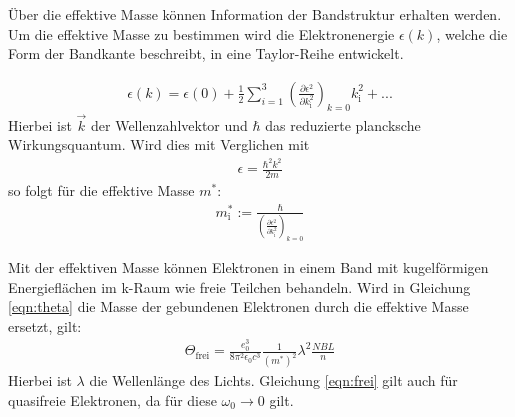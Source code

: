 Über die effektive Masse können Information der Bandstruktur erhalten werden.
Um die effektive Masse zu bestimmen wird die Elektronenergie $\epsilon (k)$,
welche die Form der Bandkante beschreibt, in eine Taylor-Reihe entwickelt.

\begin{align}
  \epsilon(k) = \epsilon (0) + \frac{1}{2} \sum_{i=1}^3 \left(\frac{\partial \epsilon^2}{\partial k^2_{\mathrm{i}}}\right)_{k=0} k_{\mathrm{i}}^2 + ...
\end{align}
Hierbei ist $\vec{k}$ der Wellenzahlvektor und $\hbar$ das reduzierte plancksche Wirkungsquantum.
Wird dies mit Verglichen mit
\begin{align}
  \epsilon = \frac{\hbar^2 k^2}{2m}
\end{align}
so folgt für die effektive Masse $m^*$:
\begin{align}
  m^*_{\mathrm{i}} := \frac{\hbar}{\left(\frac{\partial \epsilon^2}{\partial k^2_{\mathrm{i}}}\right)_{k=0}}
\end{align}

Mit der effektiven Masse können Elektronen in einem Band mit kugelförmigen
Energieflächen im k-Raum wie freie Teilchen behandeln.
Wird in Gleichung \ref{eqn:theta} die Masse der gebundenen Elektronen durch die effektive Masse ersetzt, gilt:
\begin{align}
  \Theta_{\mathrm{frei}} = \frac{e^3_0}{8 \pi^2 \epsilon_0 c^3}\frac{1}{\left(m^{*}\right)^2} \lambda^2 \frac{NBL}{n} \label{eqn:frei}
\end{align}
Hierbei ist $\lambda$ die Wellenlänge des Lichts.
Gleichung \ref{eqn:frei} gilt auch für quasifreie Elektronen, da für diese $\omega_0 \rightarrow 0$ gilt.
